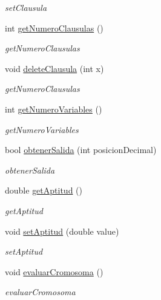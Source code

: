 \begin{DoxyCompactItemize}
\begin{DoxyCompactList}\small\item\em set\-Clausula \end{DoxyCompactList}\item 
int \hyperlink{classCromosoma_a53e4a3cda8f7a0b2233f0219579f7cc3}{get\-Numero\-Clausulas} ()
\begin{DoxyCompactList}\small\item\em get\-Numero\-Clausulas \end{DoxyCompactList}\item 
void \hyperlink{classCromosoma_ad9c66633c62ac96944faae7e778beb21}{delete\-Clausula} (int x)
\begin{DoxyCompactList}\small\item\em get\-Numero\-Clausulas \end{DoxyCompactList}\item 
int \hyperlink{classCromosoma_a825104a1dd2a7595d119907c84fd2fd1}{get\-Numero\-Variables} ()
\begin{DoxyCompactList}\small\item\em get\-Numero\-Variables \end{DoxyCompactList}\item 
bool \hyperlink{classCromosoma_a8a75eb52e417f9c050c32969b56984e7}{obtener\-Salida} (int posicion\-Decimal)
\begin{DoxyCompactList}\small\item\em obtener\-Salida \end{DoxyCompactList}\item 
double \hyperlink{classCromosoma_a280c8232e95aec0c8dd627cd579abec6}{get\-Aptitud} ()
\begin{DoxyCompactList}\small\item\em get\-Aptitud \end{DoxyCompactList}\item 
void \hyperlink{classCromosoma_a158f2fe672e3232ebf07a5724a15fc2e}{set\-Aptitud} (double value)
\begin{DoxyCompactList}\small\item\em set\-Aptitud \end{DoxyCompactList}\item 
void \hyperlink{classCromosoma_a845ebd5367a0e7978bf8d4b1ae452cbe}{evaluar\-Cromosoma} ()
\begin{DoxyCompactList}\small\item\em evaluar\-Cromosoma \end{DoxyCompactList}\end{DoxyCompactItemize}


